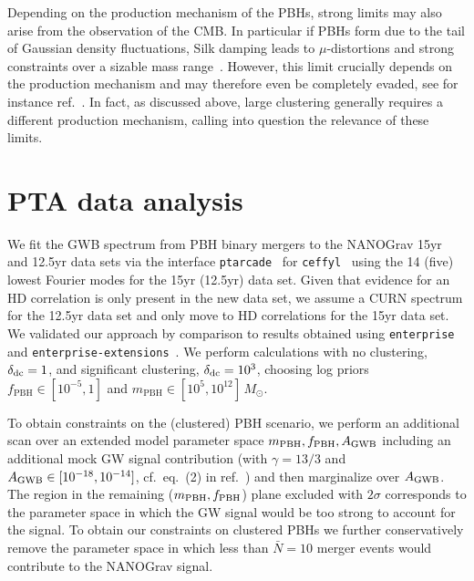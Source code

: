 Depending on the production mechanism of the \acp{PBH}, strong limits may also arise from the observation of the \ac{CMB}. In  particular if \acp{PBH} form due to the tail of Gaussian density fluctuations, Silk damping leads to $\mu$-distortions and strong constraints over  a sizable mass range~\cite{Carr:1993aq}. However, this limit crucially depends on the production mechanism and may therefore even be completely evaded, see for instance ref.~\cite{Hooper:2023nnl}. In fact, as discussed above, large clustering generally requires a different production mechanism, calling into question the relevance of these limits.


\section{PTA data analysis} \label{sec:PTAdatanalysis}

We fit the \ac{GWB} spectrum from \ac{PBH} binary mergers to the \ac{NANOGrav} 15yr and 12.5yr data sets via the interface \texttt{ptarcade}~\cite{Mitridate:2023oar} for \texttt{ceffyl}~\cite{Lamb:2023jls} using the 14 (five) lowest Fourier modes for the 15yr (12.5yr) data set. Given that evidence for an \ac{HD} correlation is only present in the new data set, we assume a \ac{CURN} spectrum for the 12.5yr  data set and only move to \ac{HD} correlations for the 15yr data set. We validated our approach by comparison to results obtained using \texttt{enterprise} and \texttt{enterprise-extensions}~\cite{enterprise,enterprise2}. We perform calculations with no clustering, $\delta_{\mathrm{dc}} = 1$, and significant clustering, $\delta_{\mathrm{dc}} = 10^3$, choosing log priors $f_\text{PBH} \in [10^{-5},1]$ and  $m_\text{PBH} \in [10^{5},10^{12}] \, M_\odot$.

To obtain constraints on the (clustered) \ac{PBH} scenario, we perform an additional scan over an extended model parameter space $m_{\mathrm{PBH}}, f_{\mathrm{PBH}}, A_{\mathrm{GWB}}$ including an additional mock \ac{GW} signal contribution (with $\gamma = 13/3$ and $A_{\mathrm{GWB}} \in [10^{-18},10^{-14}]$, cf.~eq.~(2) in ref.~\cite{NANOGrav:2020bcs}) and then marginalize over $A_{\mathrm{GWB}}$. The region in the remaining ($m_{\mathrm{PBH}}, f_{\mathrm{PBH}}$) plane  excluded with $2\sigma$ corresponds to the parameter space in which the \ac{GW} signal would be too strong to account for the signal. To obtain our constraints on clustered \acp{PBH} we further conservatively remove the parameter space in which less than $\bar{N} = 10$  merger events would contribute to the \ac{NANOGrav} signal.


